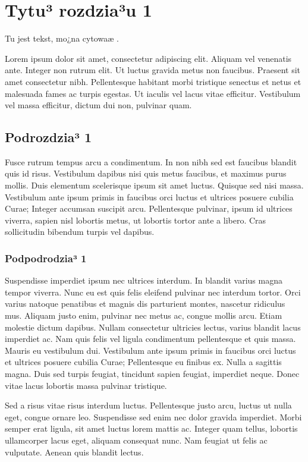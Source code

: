 \chapter{Tytu³ rozdzia³u 1}
Tu jest tekst, mo¿na cytowaæ \cite{article_1}.

Lorem ipsum dolor sit amet, consectetur adipiscing elit. Aliquam vel venenatis ante. Integer non rutrum elit. Ut luctus gravida metus non faucibus. Praesent sit amet consectetur nibh. Pellentesque habitant morbi tristique senectus et netus et malesuada fames ac turpis egestas. Ut iaculis vel lacus vitae efficitur. Vestibulum vel massa efficitur, dictum dui non, pulvinar quam.

\section{Podrozdzia³ 1}

Fusce rutrum tempus arcu a condimentum. In non nibh sed est faucibus blandit quis id risus. Vestibulum dapibus nisi quis metus faucibus, et maximus purus mollis. Duis elementum scelerisque ipsum sit amet luctus. Quisque sed nisi massa. Vestibulum ante ipsum primis in faucibus orci luctus et ultrices posuere cubilia Curae; Integer accumsan suscipit arcu. Pellentesque pulvinar, ipsum id ultrices viverra, sapien nisl lobortis metus, ut lobortis tortor ante a libero. Cras sollicitudin bibendum turpis vel dapibus. \cite{misc_1}

\subsection{Podpodrodzia³ 1}

Suspendisse imperdiet ipsum nec ultrices interdum. In blandit varius magna tempor viverra. Nunc eu est quis felis eleifend pulvinar nec interdum tortor. Orci varius natoque penatibus et magnis dis parturient montes, nascetur ridiculus mus. Aliquam justo enim, pulvinar nec metus ac, congue mollis arcu. Etiam molestie dictum dapibus. Nullam consectetur ultricies lectus, varius blandit lacus imperdiet ac. Nam quis felis vel ligula condimentum pellentesque et quis massa. Mauris eu vestibulum dui. Vestibulum ante ipsum primis in faucibus orci luctus et ultrices posuere cubilia Curae; Pellentesque eu finibus ex. Nulla a sagittis magna. Duis sed turpis feugiat, tincidunt sapien feugiat, imperdiet neque. Donec vitae lacus lobortis massa pulvinar tristique.

Sed a risus vitae risus interdum luctus. Pellentesque justo arcu, luctus ut nulla eget, congue ornare leo. Suspendisse sed enim nec dolor gravida imperdiet. Morbi semper erat ligula, sit amet luctus lorem mattis ac. Integer quam tellus, lobortis ullamcorper lacus eget, aliquam consequat nunc. Nam feugiat ut felis ac vulputate. Aenean quis blandit lectus.

